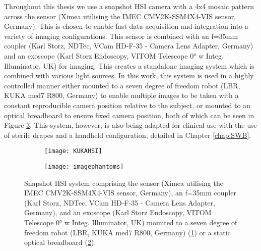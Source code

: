 Throughout this thesis we use a snapshot HSI camera with a 4x4 mosaic pattern across the sensor (Ximea utilising the IMEC CMV2K-SSM4X4-VIS sensor, Germany). This is chosen to enable fast data acquisition and integration into a variety of imaging configurations. This sensor is combined with an f=35mm coupler (Karl Storz, NDTec, VCam HD-F-35 - Camera Lens Adapter, Germany) and an exoscope (Karl Storz Endoscopy, VITOM Telescope 0° w Integ. Illuminator, UK) for imaging. This creates a standalone imaging system which is combined with various light sources. In this work, this system is used in a highly controlled manner either mounted to a seven degree of freedom robot (LBR, KUKA med7 R800, Germany) to enable multiple images to be taken with a constant reproducible camera position relative to the subject, or mounted to an optical breadboard to ensure fixed camera position, both of which can be seen in Figure \ref{fig:HSIsetups}. This system, however, is also being adapted for clinical use with the use of sterile drapes and a handheld configuration, detailed in Chapter \ref{chap:SWB}. %
\begin{figure}[h]
    \centering 
    \begin{subfigure}[ht!]{0.27\textwidth}
	\texttt{[image: KUKAHSI]}
	\caption{}
	\label{fig:KUKAHSI}
    \end{subfigure}
    \begin{subfigure}[ht!]{0.16\textwidth}
        \texttt{[image: imagephantoms]}
        \caption{}
        \label{fig:ScopeHSI}
    \end{subfigure}
    \caption{Snapshot HSI system comprising the sensor (Ximea utilising the IMEC CMV2K-SSM4X4-VIS sensor, Germany), an f=35mm coupler (Karl Storz, NDTec, VCam HD-F-35 - Camera Lens Adapter, Germany), and an exoscope (Karl Storz Endoscopy, VITOM Telescope 0° w Integ. Illuminator, UK) mounted to a seven degree of freedom robot (LBR, KUKA med7 R800, Germany) (\ref{fig:KUKAHSI}) or a static optical breadboard (\ref{fig:ScopeHSI}).}
    \label{fig:HSIsetups}
\end{figure}
%

